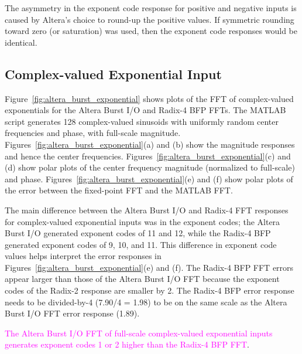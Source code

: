 \begin{enumerate}
The asymmetry in the exponent code response for positive and negative inputs
is caused by Altera's choice to round-up the positive values. If symmetric
rounding toward zero (or saturation) was used, then the exponent code
responses would be identical.
\end{enumerate}

\clearpage
\subsection{Complex-valued Exponential Input}

Figure~\ref{fig:altera_burst_exponential} shows plots of the FFT of
complex-valued exponentials for the Altera Burst I/O and Radix-4 BFP FFTs.
The MATLAB script generates 128 complex-valued sinusoids with uniformly
random center frequencies and phase, with full-scale magnitude.
%
Figures~\ref{fig:altera_burst_exponential}(a) and (b) show the magnitude
responses and hence the center frequencies.
%
Figures~\ref{fig:altera_burst_exponential}(c) and (d) show polar plots
of the center frequency magnitude (normalized to full-scale) and phase.
%
Figures~\ref{fig:altera_burst_exponential}(e) and (f) show polar plots
of the error between the fixed-point FFT and the MATLAB FFT.

The main difference between the Altera Burst I/O and Radix-4 FFT responses
for complex-valued exponential inputs was in the exponent codes;
the Altera Burst I/O generated exponent codes of 11 and 12, while the
Radix-4 BFP generated exponent codes of 9, 10, and 11.
%
This difference in exponent code values helps interpret the error responses in
Figures~\ref{fig:altera_burst_exponential}(e) and (f). The Radix-4 BFP FFT
errors appear larger than those of the Altera Burst I/O FFT because the
exponent codes of the Radix-2 response are smaller by 2. The Radix-4 BFP
error response needs to be divided-by-4 (7.90/4 = 1.98) to be on the same
scale as the Altera Burst I/O FFT error response (1.89).

\textcolor{magenta}{The Altera Burst I/O FFT of full-scale complex-valued
exponential inputs generates exponent codes 1 or 2 higher than the Radix-4 BFP FFT}.

